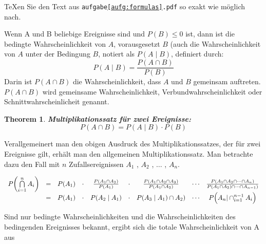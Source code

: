 \singlespacing

\begin{aufgabe}\label{aufg:formulas}
\TeX en Sie den Text aus \texttt{aufgabe\ref{aufg:formulas}.pdf} so exakt wie m\"oglich nach.	
\end{aufgabe}

\setlength\parindent{18pt} Wenn A und B beliebige Ereignisse sind und $P(B) \leq 0$ ist, dann ist die bedingte Wahrscheinlichkeit von $A$,
vorausgesetzt $B$ (auch die Wahrscheinlichkeit von $A$ unter der Bedingung $B$, notiert als $P(A \mid B)$, definiert
durch:
\begin{displaymath}
 P(A \mid B) = \frac{P(A \cap B)}{P(B)}
\end{displaymath}
Darin ist $P(A \cap B)$ die Wahrscheinlichkeit, dass $A$ und $B$ gemeinsam auftreten. 
$P(A \cap B)$ wird gemeinsame Wahrscheinlichkeit, Verbundwahrscheinlichkeit oder Schnittwahrscheinlicheit genannt.

\newtheorem{mfze}{Theorem}

\begin{mfze}{\textbf{Multiplikationssatz für zwei Ereignisse:}}
\begin{equation}
 P(A \cap B) = P(A \mid B) \cdot P(B)
\end{equation}
\end{mfze}

Verallgemeinert man den obigen Ausdruck des Multiplikationssatzes, der für zwei Ereignisse gilt, erhält man den
allgemeinen Multiplikationssatz. Man betrachte dazu den Fall mit $n$ Zufallsereignissen $A_1$ , $A_2$ , $\ldots$ , $A_n$.

\vspace{0.5cm}
\noindent
\begin{equation*}
 \begin{array}{ccccccccc} 
  P\biggl( \bigcap\limits_{i=1}^{n} A_i \biggl) &
  = &
  P(A_1) &
  \cdot &
  \frac{P(A_1 \cap A_2)}{P(A_1)} &
  \cdot &
  \frac{P(A_1 \cap A_2 \cap A_3)}{P(A_1 \cap A_2)} &
  \cdots &
  \frac{P(A_1 \cap A_2 \cap \cdots \cap A_n)}{ P(A_1 \cap A_2) \cap \cdots \cap A_{n-1}) }\\
    &
   = &
   P(A_1) &
   \cdot &
   P(A_2 \mid A_1) &
   \cdot &
   P(A_3 \mid A_1) \cap A_2) &
   \cdots &
   P\Bigl( A_n | \cap_{i=1}^{n-1} A_i \Bigl) \\
 \end{array}
\end{equation*}

\setlength\parindent{18pt} Sind nur bedingte Wahrscheinlichkeiten und die Wahrscheinlichkeiten des bedingenden
Ereignisses bekannt, ergibt sich die totale Wahrscheinlichkeit von A aus

